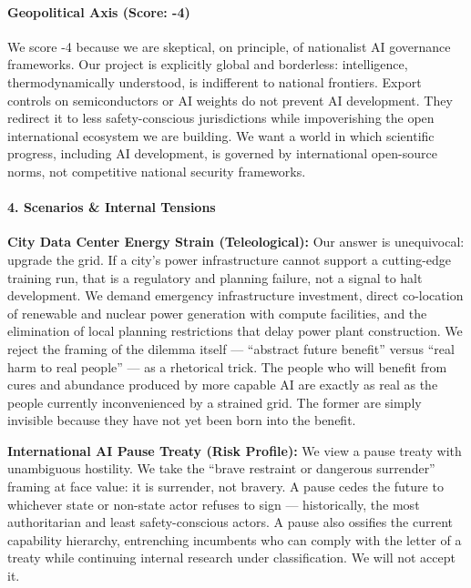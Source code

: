 \paragraph{Geopolitical Axis (Score:
-4)}\label{geopolitical-axis-score--4}

We score -4 because we are skeptical, on principle, of nationalist AI
governance frameworks. Our project is explicitly global and borderless:
intelligence, thermodynamically understood, is indifferent to national
frontiers. Export controls on semiconductors or AI weights do not
prevent AI development. They redirect it to less safety-conscious
jurisdictions while impoverishing the open international ecosystem we
are building. We want a world in which scientific progress, including AI
development, is governed by international open-source norms, not
competitive national security frameworks.

\paragraph{4. Scenarios \& Internal
Tensions}\label{scenarios-internal-tensions-11}

\textbf{City Data Center Energy Strain (Teleological):} Our answer is
unequivocal: upgrade the grid. If a city's power infrastructure cannot
support a cutting-edge training run, that is a regulatory and planning
failure, not a signal to halt development. We demand emergency
infrastructure investment, direct co-location of renewable and nuclear
power generation with compute facilities, and the elimination of local
planning restrictions that delay power plant construction. We reject the
framing of the dilemma itself --- ``abstract future benefit'' versus
``real harm to real people'' --- as a rhetorical trick. The people who
will benefit from cures and abundance produced by more capable AI are
exactly as real as the people currently inconvenienced by a strained
grid. The former are simply invisible because they have not yet been
born into the benefit.

\textbf{International AI Pause Treaty (Risk Profile):} We view a pause
treaty with unambiguous hostility. We take the ``brave restraint or
dangerous surrender'' framing at face value: it is surrender, not
bravery. A pause cedes the future to whichever state or non-state actor
refuses to sign --- historically, the most authoritarian and least
safety-conscious actors. A pause also ossifies the current capability
hierarchy, entrenching incumbents who can comply with the letter of a
treaty while continuing internal research under classification. We will
not accept it.

